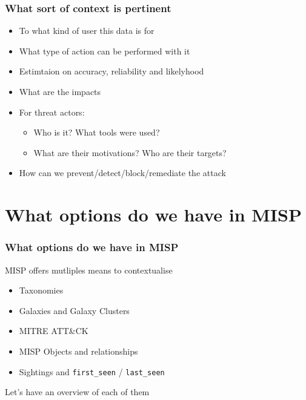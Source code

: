 \begin{frame}
    \frametitle{What sort of context is pertinent}
    \begin{itemize}
        \item To what kind of user this data is for
        \item What type of action can be performed with it 
        \item Estimtaion on accuracy, reliability and likelyhood
        \item What are the impacts
        \item For threat actors:
        \begin{itemize}
            \item Who is it? What tools were used?
            \item What are their motivations? Who are their targets?
        \end{itemize}
        \item How can we prevent/detect/block/remediate the attack
    \end{itemize}
\end{frame}

\section{What options do we have in MISP}
\begin{frame}
    \frametitle{What options do we have in MISP}
    MISP offers mutliples means to contextualise
    \begin{itemize}
        \item Taxonomies
        \item Galaxies and Galaxy Clusters
        \item MITRE ATT\&CK
        \item MISP Objects and relationships
        \item Sightings and \texttt{first\_seen} / \texttt{last\_seen}
    \end{itemize}

    Let's have an overview of each of them
\end{frame}

